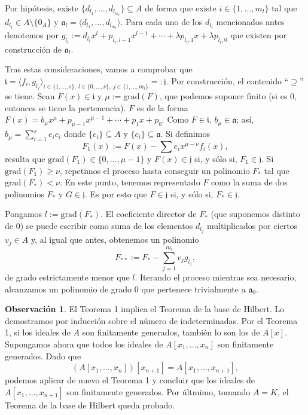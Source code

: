\documentclass[a4paper,12pt]{article}
\newcommand{\af}{\mathfrak{a}}
\newcommand{\grad}{\text{grad}}
\theoremstyle{definition}
\newtheorem{remark}[theorem]{Observación}
\begin{document}
Por hipótesis, existe $\{d_{l_1},\dots,d_{l_{m_l}}\}\subseteq A$ de forma que existe $i\in\{1,\dots,m_l\}$ tal que $d_{l_i}\in A\setminus\{0_A\}$ y $\af_l=\langle d_{l_1},\dots,d_{l_{m_l}}\rangle$. Para cada uno de los $d_{l_i}$ mencionados antes denotemos por $g_{l_i}:=d_{l_i}x^l+p_{l_i,l-1}x^{l-1}+\cdots+\lambda p_{l_i,1}x+\lambda p_{l_i,0}$ que existen por construcción de $\af_l$.

Tras estas consideraciones, vamos a comprobar que $\mathfrak{i}=\langle f_i,g_{l_j}\rangle_{i\in\{1,\dots,s\},\ l\in\{0,\dots,\nu\},\ j\in\{1,\dots,m_l\}}=:\mathfrak{j}$. Por construcción, el contenido ``$\supseteq$'' se tiene. Sean $F(x)\in\mathfrak{i}$ y $\mu:=\grad(F)$, que podemos suponer finito (si es $0$, entonces se tiene la pertenencia). $F$ es de la forma $F(x)=b_\mu x^\mu+p_{\mu-1}x^{\mu-1}+\cdots+p_1x+p_0$. 
Como $F\in\mathfrak{i}$, $b_\mu\in\af$; así, $b_\mu=\sum_{i=1}^se_ic_i$ donde $\{e_i\}\subseteq A$ y $\{c_i\}\subseteq\af$. Si definimos$$F_1(x):=F(x)-\sum e_ix^{\mu-\nu}f_i(x),$$
resulta que $\grad(F_1)\in\{0,\dots,\mu-1\}$ y $F(x)\in\mathfrak{j}$ si, y sólo si, $F_1\in\mathfrak{j}$. Si $\grad(F_1)\ge\nu$, repetimos el proceso hasta conseguir un polinomio $F_{*}$ tal que $\grad(F_*)<\nu$. En este punto, tenemos representado $F$ como la suma de dos polinomios $F_*$ y $G\in\mathfrak{j}$. Es por esto que $F\in\mathfrak{j}$ si, y sólo si, $F_*\in\mathfrak{j}$.

Pongamos $l:=\grad(F_*)$. El coeficiente director de $F_*$ (que suponemos distinto de $0$) se puede escribir como suma de los elementos $d_{l_j}$ multiplicados por ciertos $v_j\in A$ y, al igual que antes, obtenemos un polinomio$$F_{**}:=F_*-\sum_{j=1}^{m_l}v_jg_{l_j},$$de grado estrictamente menor que $l$. Iterando el proceso mientras sea necesario, alcanzamos un polinomio de grado $0$ que pertenece trivialmente a $\af_0$.

\begin{remark} El Teorema 1 implica el Teorema de la base de Hilbert. Lo demostramos por inducción sobre el número de indeterminadas. Por el Teorema 1, si los ideales de $A$ son finitamente generados, también lo son los de $A[x]$. Supongamos ahora que todos los ideales de $A[x_1,\dots,x_n]$ son finitamente generados. Dado que$$(A[x_1,\dots,x_n])[x_{n+1}]=A[x_1,\dots,x_{n+1}],$$podemos aplicar de nuevo el Teorema 1 y concluir que los ideales de $A[x_1,\dots,x_{n+1}]$ son finitamente generados. Por últmimo, tomando $A=K$, el Teorema de la base de Hilbert queda probado.
\end{remark}
\end{document}

